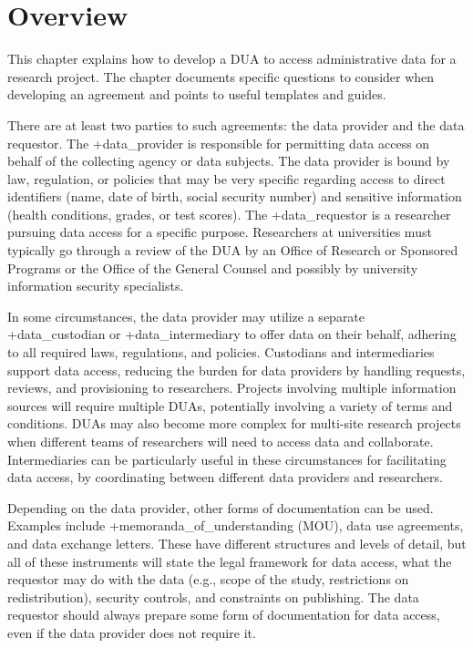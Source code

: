 \documentclass[
]{book}
\begin{document}
\hypertarget{overview}{%
\section{Overview}\label{overview}}

This chapter explains how to develop a DUA to access administrative data for a research project. The chapter documents specific questions to consider when developing an agreement and points to useful templates and guides.

There are at least two parties to such agreements: the data provider and the data requestor. The +data\_provider\textbar{} is responsible for permitting data access on behalf of the collecting agency or data subjects. The data provider is bound by law, regulation, or policies that may be very specific regarding access to direct identifiers (name, date of birth, social security number) and sensitive information (health conditions, grades, or test scores). The +data\_requestor\textbar{} is a researcher pursuing data access for a specific purpose. Researchers at universities must typically go through a review of the DUA by an Office of Research or Sponsored Programs or the Office of the General Counsel and possibly by university information security specialists.

In some circumstances, the data provider may utilize a separate +data\_custodian\textbar{} or +data\_intermediary\textbar{} to offer data on their behalf, adhering to all required laws, regulations, and policies. Custodians and intermediaries support data access, reducing the burden for data providers by handling requests, reviews, and provisioning to researchers. Projects involving multiple information sources will require multiple DUAs, potentially involving a variety of terms and conditions. DUAs may also become more complex for multi-site research projects when different teams of researchers will need to access data and collaborate. Intermediaries can be particularly useful in these circumstances for facilitating data access, by coordinating between different data providers and researchers.

Depending on the data provider, other forms of documentation can be used. Examples include +memoranda\_of\_understanding\textbar{} (MOU), data use agreements, and data exchange letters. These have different structures and levels of detail, but all of these instruments will state the legal framework for data access, what the requestor may do with the data (e.g., scope of the study, restrictions on redistribution), security controls, and constraints on publishing. The data requestor should always prepare some form of documentation for data access, even if the data provider does not require it.
\end{document}
